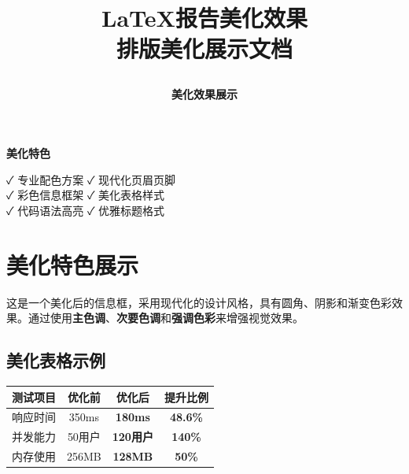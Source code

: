 \documentclass[12pt,a4paper]{article}
\title{
    \vspace{-2cm}
    \begin{tcolorbox}[
        colback=primary,
        coltext=white,
        halign=center,
        rounded corners=10pt,
        drop shadow
    ]
    \huge\textbf{LaTeX报告美化效果}\\[0.5cm]
    \Large\textbf{排版美化展示文档}
    \end{tcolorbox}
    \vspace{1cm}
}
\author{
    \begin{tcolorbox}[
        colback=light,
        colframe=secondary,
        halign=center,
        rounded corners=5pt,
        width=0.8\textwidth
    ]
    \large
    \textbf{美化效果展示}
    \end{tcolorbox}
}
\date{
    \begin{tcolorbox}[
        colback=secondary!20,
        colframe=secondary,
        halign=center,
        rounded corners=5pt,
        width=0.5\textwidth
    ]
    \large\today
    \end{tcolorbox}
}
\begin{document}
\thispagestyle{empty}
\maketitle

\vfill

\begin{center}
\begin{tcolorbox}[
    colback=accent!20,
    colframe=accent,
    width=0.9\textwidth,
    rounded corners=8pt,
    halign=center
]
\textbf{\large 美化特色}\\[0.3cm]
\begin{minipage}{0.8\textwidth}
\centering
✓ 专业配色方案 \quad ✓ 现代化页眉页脚\\[0.2cm]
✓ 彩色信息框架 \quad ✓ 美化表格样式\\[0.2cm]
✓ 代码语法高亮 \quad ✓ 优雅标题格式
\end{minipage}
\end{tcolorbox}
\end{center}

\newpage

\section{美化特色展示}

\begin{infobox}[title={信息框展示}]
这是一个美化后的信息框，采用现代化的设计风格，具有圆角、阴影和渐变色彩效果。通过使用\textcolor{primary}{\textbf{主色调}}、\textcolor{secondary}{\textbf{次要色调}}和\textcolor{success}{\textbf{强调色彩}}来增强视觉效果。
\end{infobox}

\subsection{美化表格示例}

\begin{table}[H]
\centering
\begin{tcolorbox}[
    colback=light,
    colframe=primary,
    title={\textbf{性能测试结果}},
    coltitle=white,
    colbacktitle=primary,
    fonttitle=\bfseries,
    rounded corners=5pt,
    width=0.85\textwidth
]
\begin{tabular}{cccc}
\toprule
\rowcolor{secondary!20}
\textbf{测试项目} & \textbf{优化前} & \textbf{优化后} & \textbf{提升比例} \\
\midrule
响应时间 & 350ms & \textcolor{success}{\textbf{180ms}} & \textcolor{success}{\textbf{48.6\%}} \\
\rowcolor{light}
并发能力 & 50用户 & \textcolor{success}{\textbf{120用户}} & \textcolor{success}{\textbf{140\%}} \\
内存使用 & 256MB & \textcolor{success}{\textbf{128MB}} & \textcolor{success}{\textbf{50\%}} \\
\bottomrule
\end{tabular}
\end{tcolorbox}
\end{table}
\end{document}
